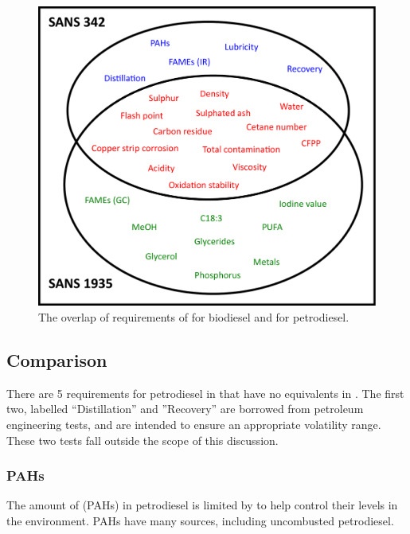 \begin{figure}
\centering
\includegraphics[width=\textwidth]{Figures/Venn.pdf}
\decoRule

\caption[Overlap of requirements ]{The overlap of requirements of  for biodiesel and  for petrodiesel.}

\label{fig:Venn}
\end{figure}

\subsection{Comparison}
There are \num{5} requirements for petrodiesel in  that have no
equivalents in . The first two, labelled ``Distillation'' and
''Recovery'' are borrowed from petroleum engineering tests, and are intended to
ensure an appropriate volatility range. These two tests fall outside the scope
of this discussion.

\subsubsection{PAHs}
The amount of  (PAHs) in petrodiesel
is limited by  to help control their levels in the environment.
PAHs have many sources, including uncombusted petrodiesel.


